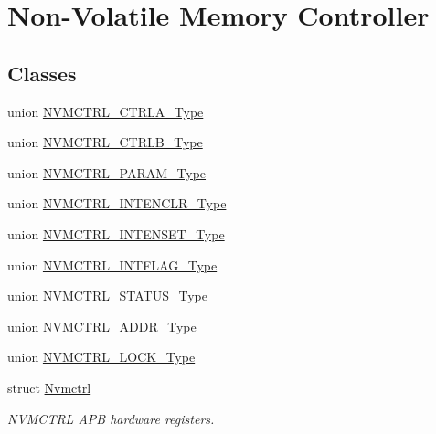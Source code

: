 \hypertarget{group___s_a_m_l21___n_v_m_c_t_r_l}{}\section{Non-\/\+Volatile Memory Controller}
\label{group___s_a_m_l21___n_v_m_c_t_r_l}
\subsection*{Classes}
\begin{DoxyCompactItemize}
\item 
union \hyperlink{union_n_v_m_c_t_r_l___c_t_r_l_a___type}{N\+V\+M\+C\+T\+R\+L\+\_\+\+C\+T\+R\+L\+A\+\_\+\+Type}
\item 
union \hyperlink{union_n_v_m_c_t_r_l___c_t_r_l_b___type}{N\+V\+M\+C\+T\+R\+L\+\_\+\+C\+T\+R\+L\+B\+\_\+\+Type}
\item 
union \hyperlink{union_n_v_m_c_t_r_l___p_a_r_a_m___type}{N\+V\+M\+C\+T\+R\+L\+\_\+\+P\+A\+R\+A\+M\+\_\+\+Type}
\item 
union \hyperlink{union_n_v_m_c_t_r_l___i_n_t_e_n_c_l_r___type}{N\+V\+M\+C\+T\+R\+L\+\_\+\+I\+N\+T\+E\+N\+C\+L\+R\+\_\+\+Type}
\item 
union \hyperlink{union_n_v_m_c_t_r_l___i_n_t_e_n_s_e_t___type}{N\+V\+M\+C\+T\+R\+L\+\_\+\+I\+N\+T\+E\+N\+S\+E\+T\+\_\+\+Type}
\item 
union \hyperlink{union_n_v_m_c_t_r_l___i_n_t_f_l_a_g___type}{N\+V\+M\+C\+T\+R\+L\+\_\+\+I\+N\+T\+F\+L\+A\+G\+\_\+\+Type}
\item 
union \hyperlink{union_n_v_m_c_t_r_l___s_t_a_t_u_s___type}{N\+V\+M\+C\+T\+R\+L\+\_\+\+S\+T\+A\+T\+U\+S\+\_\+\+Type}
\item 
union \hyperlink{union_n_v_m_c_t_r_l___a_d_d_r___type}{N\+V\+M\+C\+T\+R\+L\+\_\+\+A\+D\+D\+R\+\_\+\+Type}
\item 
union \hyperlink{union_n_v_m_c_t_r_l___l_o_c_k___type}{N\+V\+M\+C\+T\+R\+L\+\_\+\+L\+O\+C\+K\+\_\+\+Type}
\item 
struct \hyperlink{struct_nvmctrl}{Nvmctrl}
\begin{DoxyCompactList}\small\item\em N\+V\+M\+C\+T\+R\+L A\+P\+B hardware registers. \end{DoxyCompactList}\end{DoxyCompactItemize}

